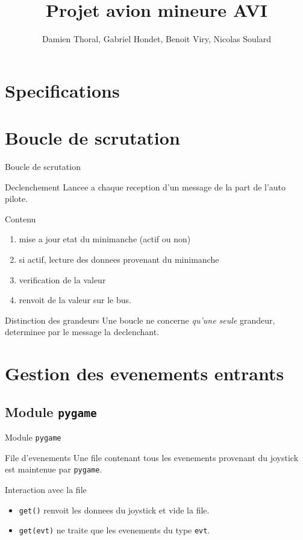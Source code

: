 \documentclass[tikz, footheight=2em]{beamer}
\title{Projet avion mineure AVI}
\author{Damien Thoral, Gabriel Hondet, Benoit Viry, Nicolas Soulard}
\date{}
\begin{document}
\frame{\titlepage}


\section{Specifications}

\section{Boucle de scrutation}
\begin{frame}[t]{Boucle de scrutation}
  \begin{block}{Declenchement}
    Lancee a chaque reception d'un message de la part de l'auto pilote.
  \end{block}

  \begin{block}{Contenu}
    \begin{enumerate}
      \item mise a jour etat du minimanche (actif ou non)
      \item si actif, lecture des donnees provenant du minimanche
      \item verification de la valeur
      \item renvoit de la valeur sur le bus.
    \end{enumerate}
  \end{block}

  \begin{block}{Distinction des grandeurs}
    Une boucle ne concerne \emph{qu'une seule} grandeur, determinee par le
    message la declenchant.
  \end{block}
\end{frame}

\section{Gestion des evenements entrants}
\subsection{Module \texttt{pygame}}
\begin{frame}[t]{Module \texttt{pygame}}
  \begin{block}{File d'evenements}
    Une file contenant tous les evenements provenant du joystick est maintenue
    par \texttt{pygame}.
  \end{block}
  \begin{block}{Interaction avec la file}
    \begin{itemize}
      \item \texttt{get()} renvoit les donnees du joystick et vide la file.
      \item \texttt{get(evt)} ne traite que les evenements du type \texttt{evt}.
    \end{itemize}
  \end{block}
\end{frame}
\end{document}
